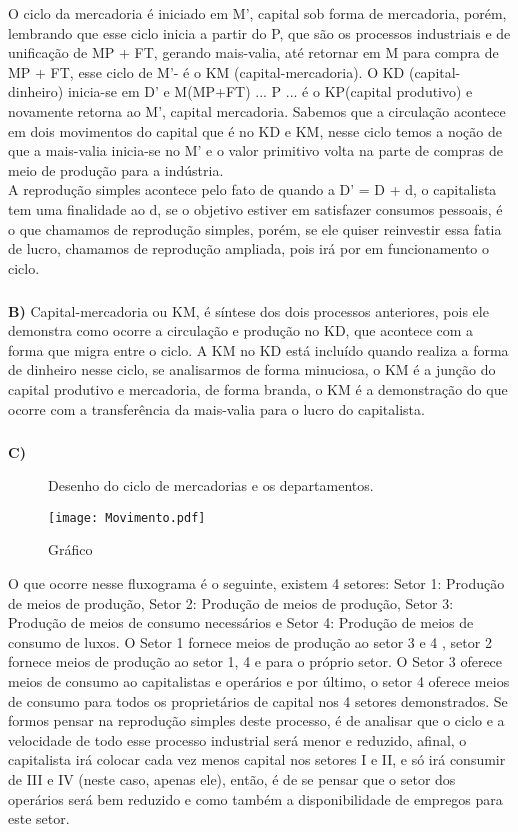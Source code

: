\documentclass[a4paper, 12pt]{article} %
\begin{document}
O ciclo da mercadoria é iniciado em M', capital sob forma de mercadoria, porém, lembrando que esse ciclo inicia a partir do P, que são os processos industriais e de unificação de MP + FT, gerando mais-valia, até retornar em M para compra de MP + FT, esse ciclo de M'- é o KM (capital-mercadoria). O KD (capital-dinheiro) inicia-se em D' e  M(MP+FT) ... P ... é o KP(capital produtivo) e novamente retorna ao M', capital mercadoria.
Sabemos que a circulação acontece em dois movimentos do capital que é no KD e KM, nesse ciclo temos a noção de que a mais-valia inicia-se no M'  e o valor primitivo volta na parte de compras de meio de produção para a indústria. \\
A reprodução simples acontece pelo fato de quando a D' = D + d, o capitalista tem uma finalidade ao d, se o objetivo estiver em satisfazer consumos pessoais, é o que chamamos de reprodução simples, porém, se ele quiser reinvestir essa fatia de lucro, chamamos de reprodução ampliada, pois irá por em funcionamento o ciclo.

\subparagraph{} \textbf{B)} Capital-mercadoria ou KM, é síntese dos dois processos anteriores, pois ele demonstra como ocorre a circulação e produção no KD, que acontece com a forma que migra entre o ciclo. A KM no KD está incluído quando realiza a forma de dinheiro nesse ciclo, se analisarmos de forma minuciosa, o KM é a junção do capital produtivo e mercadoria, de forma branda, o KM é a demonstração do que ocorre com a transferência da mais-valia para o lucro do capitalista.

\subparagraph{} \textbf{C)} 
\begin{figure}[h]
	\begin{center}
		\caption{Desenho do ciclo de mercadorias e os departamentos. }
		\texttt{[image: Movimento.pdf]}
	\end{center}
	\caption{Gráfico}\label{fig:02}
\end{figure}

O que ocorre nesse fluxograma é o seguinte, existem 4 setores: Setor 1: Produção de meios de produção, Setor 2: Produção de meios de produção, Setor 3: Produção de meios de consumo necessários e Setor 4: Produção de meios de consumo de luxos. O Setor 1 fornece meios de produção ao setor 3 e 4 , setor 2 fornece meios de produção ao setor 1, 4 e para o próprio setor. O Setor 3 oferece meios de consumo ao capitalistas e operários e por último, o setor 4 oferece meios de consumo para todos os proprietários de capital nos 4 setores demonstrados. Se formos pensar na reprodução simples deste processo, é de analisar que o ciclo e a velocidade de todo esse processo industrial será menor e reduzido, afinal, o capitalista irá colocar cada vez menos capital nos setores I e II, e só irá consumir de III e IV (neste caso, apenas ele), então, é de se pensar que o setor dos operários será bem reduzido e como também a disponibilidade de empregos para este setor.
\end{document}
